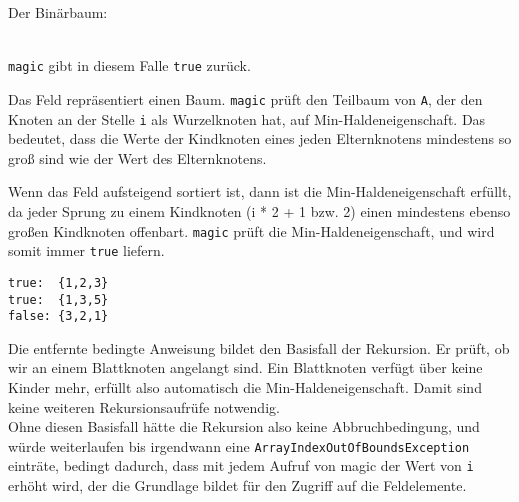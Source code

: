 \begin{aufgabe}%

\begin{teile}
	\item 
	Der Binärbaum: \\
	 \\

	
	\item
	{\larger\texttt{magic}} gibt in diesem Falle {\larger\texttt{true}} zurück. \\ 
	 
	\item
	Das Feld  repräsentiert einen Baum. {\larger\texttt{magic}} prüft den Teilbaum von {\larger\texttt{A}}, der den Knoten an der Stelle {\larger\texttt{i}} als Wurzelknoten hat, auf Min-Haldeneigenschaft. 
	Das bedeutet, dass die Werte der Kindknoten eines jeden Elternknotens mindestens so groß sind wie der Wert des Elternknotens. \\
	
	\item
	Wenn das Feld aufsteigend sortiert ist, dann ist die Min-Haldeneigenschaft erfüllt, da jeder Sprung zu einem Kindknoten (i * 2 + 1 bzw. 2) einen mindestens ebenso großen Kindknoten offenbart. {\larger\texttt{magic}} prüft die Min-Haldeneigenschaft, und wird somit immer {\larger\texttt{true}} liefern. \\
	
	\item
	{\larger\texttt{true: \ \{1,2,3\}}} \\
	{\larger\texttt{true: \ \{1,3,5\}}} \\
	{\larger\texttt{false: \{3,2,1\}}} \\
	
	\item
	Die entfernte bedingte Anweisung bildet den Basisfall der Rekursion. Er prüft, ob wir an einem Blattknoten angelangt sind. Ein Blattknoten verfügt über keine Kinder mehr, erfüllt also automatisch die Min-Haldeneigenschaft. Damit sind keine weiteren Rekursionsaufrüfe notwendig. \\
	Ohne diesen Basisfall hätte die Rekursion also keine Abbruchbedingung, und würde weiterlaufen bis irgendwann eine {\larger\texttt{ArrayIndexOutOfBoundsException}} einträte, bedingt dadurch, dass mit jedem Aufruf von magic der Wert von {\larger\texttt{i}} erhöht wird, der die Grundlage bildet für den Zugriff auf die Feldelemente. \\  	
	

\end{teile}
\end{aufgabe}
